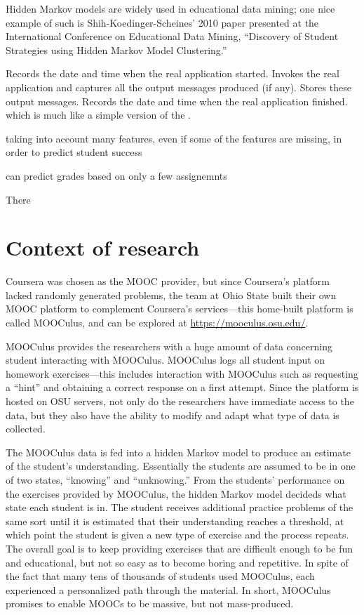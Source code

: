 \documentclass[12pt]{article}
\begin{document}
Hidden Markov models are widely used in educational data mining; one
nice example of such is Shih-Koedinger-Scheines' 2010 paper
presented at the International Conference on Educational Data Mining,
``Discovery of Student Strategies using Hidden Markov Model
Clustering.''  \parencite{shihdiscovery}


Records the date and time when the real application started.
Invokes the real application and captures all the output messages produced (if any).
Stores these output messages.
Records the date and time when the real application finished.
\parencite{RomeroZaldivar20121058} 
which is much like a simple version of the \parencite{tin-can-api}.


taking into account many features, even if some of the features are
missing, in order to predict student
success \parencite{Zafra201115020}

can predict grades based on only a few assignemnts \parencite{predict-grades}


There 



\section{Context of research}

Coursera was chosen as the MOOC provider, but since Coursera's
platform lacked randomly generated problems, the team at Ohio State
built their own MOOC platform to complement Coursera's services---this
home-built platform is called MOOCulus, and can be explored at
\url{https://mooculus.osu.edu/}.

MOOCulus provides the researchers with a huge amount of data
concerning student interacting with MOOCulus. MOOCulus logs all
student input on homework exercises---this includes interaction with
MOOCulus such as requesting a ``hint'' and obtaining a correct
response on a first attempt.  Since the platform is hosted on OSU
servers, not only do the researchers have immediate access to the
data, but they also have the ability to modify and adapt what type of
data is collected. 


The MOOCulus data is fed into a hidden Markov model to produce an
estimate of the student's understanding. Essentially the students are
assumed to be in one of two states, ``knowing'' and ``unknowing.''
From the students' performance on the exercises provided by MOOCulus,
the hidden Markov model decideds what state each student is in. The
student receives additional practice problems of the same sort until
it is estimated that their understanding reaches a threshold, at which
point the student is given a new type of exercise and the process
repeats.  The overall goal is to keep providing exercises that are
difficult enough to be fun and educational, but not so easy as to
become boring and repetitive.  In spite of the fact that many tens of
thousands of students used MOOCulus, each experienced a personalized
path through the material.  In short, MOOCulus promises to enable
MOOCs to be massive, but not mass-produced.
\end{document}
